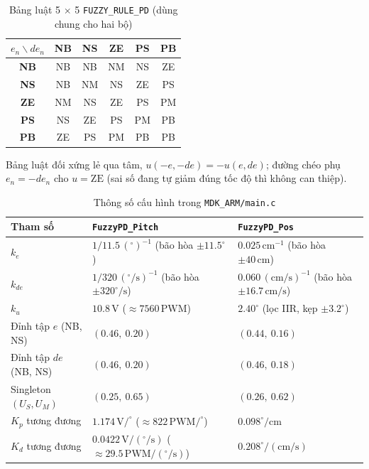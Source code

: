 \documentclass[10pt,a4paper]{article}
\begin{document}
\begin{table}[htbp]
\centering
\caption{Bảng luật 5 $\times$ 5 \texttt{FUZZY\_RULE\_PD} (dùng chung cho hai bộ)}
\label{tab:rules}
\footnotesize
\begin{tabular}{c|ccccc}
\toprule
$e_n \backslash de_n$ & \textbf{NB} & \textbf{NS} & \textbf{ZE} & \textbf{PS} & \textbf{PB} \\
\midrule
\textbf{NB} & NB & NB & NM & NS & ZE \\
\textbf{NS} & NB & NM & NS & ZE & PS \\
\textbf{ZE} & NM & NS & ZE & PS & PM \\
\textbf{PS} & NS & ZE & PS & PM & PB \\
\textbf{PB} & ZE & PS & PM & PB & PB \\
\bottomrule
\end{tabular}
\end{table}
Bảng luật đối xứng lẻ qua tâm, $u(-e, -de) = -u(e, de)$; đường chéo phụ $e_n = -de_n$ cho $u = \text{ZE}$ (sai số đang tự giảm đúng tốc độ thì không can thiệp).

\begin{table}[htbp]
\centering
\caption{Thông số cấu hình trong \texttt{MDK\_ARM/main.c}}
\label{tab:params}
\footnotesize
\begin{tabular}{l l l}
\toprule
\textbf{Tham số} & \textbf{\texttt{FuzzyPD\_Pitch}} & \textbf{\texttt{FuzzyPD\_Pos}} \\
\midrule
$k_e$ & $1/11.5\,(^\circ)^{-1}$ (bão hòa $\pm 11.5^\circ$) & $0.025\,\text{cm}^{-1}$ (bão hòa $\pm 40\,\text{cm}$) \\
$k_{de}$ & $1/320\,(^\circ/\text{s})^{-1}$ (bão hòa $\pm 320^\circ/\text{s}$) & $0.060\,(\text{cm/s})^{-1}$ (bão hòa $\pm 16.7\,\text{cm/s}$) \\
$k_u$ & $10.8\,\text{V}$ ($\approx 7560\,\text{PWM}$) & $2.40^\circ$ (lọc IIR, kẹp $\pm 3.2^\circ$) \\
Đỉnh tập $e$ (NB, NS) & $(0.46,\ 0.20)$ & $(0.44,\ 0.16)$ \\
Đỉnh tập $de$ (NB, NS) & $(0.46,\ 0.20)$ & $(0.46,\ 0.18)$ \\
Singleton $(U_S, U_M)$ & $(0.25,\ 0.65)$ & $(0.26,\ 0.62)$ \\
$K_p$ tương đương & $1.174\,\text{V}/^\circ$ ($\approx 822\,\text{PWM}/^\circ$) & $0.098^\circ/\text{cm}$ \\
$K_d$ tương đương & $0.0422\,\text{V}/(^\circ/\text{s})$ ($\approx 29.5\,\text{PWM}/(^\circ/\text{s})$) & $0.208^\circ/(\text{cm/s})$ \\
\bottomrule
\end{tabular}
\end{table}
\end{document}
